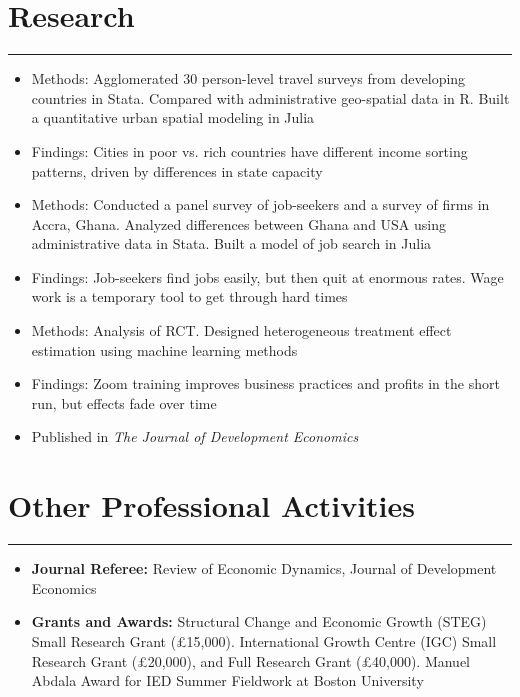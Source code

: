 \documentclass[10pt]{article}
\newenvironment{customitemize}
{ \begin{itemize}[leftmargin=\parindent, topsep = 0.2pt, itemsep = -3pt] }
{\end{itemize} }
\begin{document}
\section*{Research}
\noindent \rule{\textwidth}{1pt} 
\begin{customitemize}
	\item Methods: Agglomerated 30 person-level travel surveys from developing countries in Stata. Compared with administrative geo-spatial data in R. Built a quantitative urban spatial modeling in Julia
	\item Findings: Cities in poor vs. rich countries have different income sorting patterns, driven by differences in state capacity
\end{customitemize}
\begin{customitemize}
\item Methods: Conducted a panel survey of job-seekers and a survey of firms in Accra, Ghana. Analyzed differences between Ghana and USA using administrative data in Stata. Built a model of job search in Julia
\item Findings: Job-seekers find jobs easily, but then quit at enormous rates. Wage work is a temporary tool to get through hard times 
\end{customitemize}
\begin{customitemize}
	\item Methods: Analysis of RCT. Designed heterogeneous treatment effect estimation using machine learning methods
	\item Findings: Zoom training improves business practices and profits in the short run, but effects fade over time
	\item Published in \textit{The Journal of Development Economics}
\end{customitemize}

\section*{Other Professional Activities}
\noindent \rule{\textwidth}{1pt} 
\begin{customitemize}
	\item \textbf{Journal Referee:} Review of Economic Dynamics, Journal of Development Economics
	\item \textbf{Grants and Awards:} Structural Change and Economic Growth (STEG) Small Research Grant (\pounds15,000). International Growth Centre (IGC) Small Research Grant (\pounds20,000), and Full Research Grant (\pounds40,000). Manuel Abdala Award for IED Summer Fieldwork at Boston University
\end{customitemize}
\end{document}

